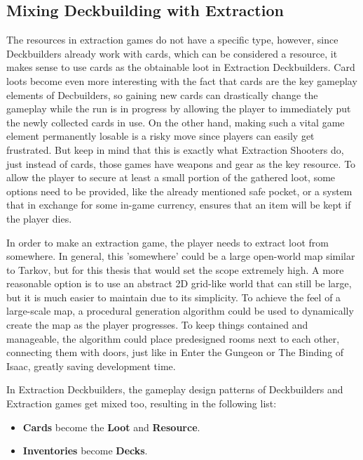 \subsection{Mixing Deckbuilding with Extraction}

The resources in extraction games do not have a specific type, however, since Deckbuilders already work with cards, which can be considered a resource, it makes sense to use cards as the obtainable loot in Extraction Deckbuilders. Card loots become even more interesting with the fact that cards are the key gameplay elements of Decbuilders, so gaining new cards can drastically change the gameplay while the run is in progress by allowing the player to immediately put the newly collected cards in use. On the other hand, making such a vital game element permanently losable is a risky move since players can easily get frustrated. But keep in mind that this is exactly what Extraction Shooters do, just instead of cards, those games have weapons and gear as the key resource. To allow the player to secure at least a small portion of the gathered loot, some options need to be provided, like the already mentioned safe pocket, or a system that in exchange for some in-game currency, ensures that an item will be kept if the player dies.

In order to make an extraction game, the player needs to extract loot from somewhere. In general, this 'somewhere' could be a large open-world map similar to Tarkov\cite{escapeFromTarkov2017}, but for this thesis that would set the scope extremely high. A more reasonable option is to use an abstract 2D grid-like world that can still be large, but it is much easier to maintain due to its simplicity. To achieve the feel of a large-scale map, a procedural generation algorithm\cite{van2013procedural} could be used to dynamically create the map as the player progresses. To keep things contained and manageable, the algorithm could place predesigned rooms next to each other, connecting them with doors, just like in Enter the Gungeon\cite{enterTheGungeon2016} or The Binding of Isaac\cite{theBindingOfIsaacRebirth2014}, greatly saving development time.

In Extraction Deckbuilders, the gameplay design patterns of Deckbuilders and Extraction games get mixed too, resulting in the following list:

\begin{itemize}
    \item \textbf{Cards} become the \textbf{Loot} and \textbf{Resource}.
    \item \textbf{Inventories} become \textbf{Decks}.
\end{itemize}



